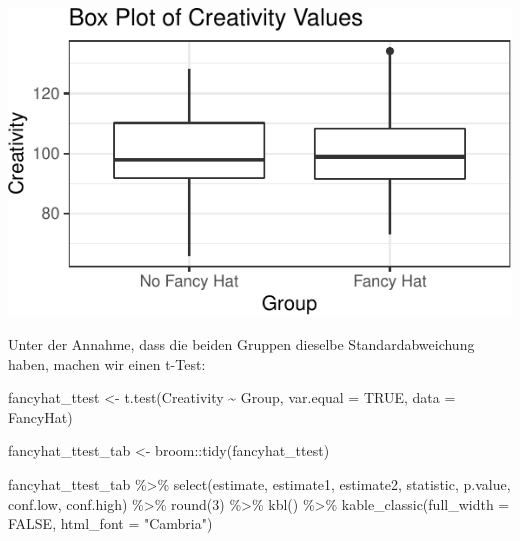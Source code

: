 \documentclass[]{tufte-handout}
\newenvironment{Shaded}{}{}
\newcommand{\AttributeTok}[1]{\textcolor[rgb]{0.49,0.56,0.16}{#1}}
\newcommand{\ConstantTok}[1]{\textcolor[rgb]{0.53,0.00,0.00}{#1}}
\newcommand{\DecValTok}[1]{\textcolor[rgb]{0.25,0.63,0.44}{#1}}
\newcommand{\FunctionTok}[1]{\textcolor[rgb]{0.02,0.16,0.49}{#1}}
\newcommand{\NormalTok}[1]{#1}
\newcommand{\OtherTok}[1]{\textcolor[rgb]{0.00,0.44,0.13}{#1}}
\newcommand{\SpecialCharTok}[1]{\textcolor[rgb]{0.25,0.44,0.63}{#1}}
\newcommand{\StringTok}[1]{\textcolor[rgb]{0.25,0.44,0.63}{#1}}
\begin{document}
\includegraphics{01-intro-bayesian-stats_files/figure-latex/unnamed-chunk-3-1}

Unter der Annahme, dass die beiden Gruppen dieselbe Standardabweichung
haben, machen wir einen t-Test:

\begin{Shaded}
\begin{Highlighting}[]
\NormalTok{fancyhat\_ttest }\OtherTok{\textless{}{-}} \FunctionTok{t.test}\NormalTok{(Creativity }\SpecialCharTok{\textasciitilde{}}\NormalTok{ Group,}
       \AttributeTok{var.equal =} \ConstantTok{TRUE}\NormalTok{,}
       \AttributeTok{data =}\NormalTok{ FancyHat)}
\end{Highlighting}
\end{Shaded}

\begin{Shaded}
\begin{Highlighting}[]
\NormalTok{fancyhat\_ttest\_tab }\OtherTok{\textless{}{-}}\NormalTok{ broom}\SpecialCharTok{::}\FunctionTok{tidy}\NormalTok{(fancyhat\_ttest)}
\end{Highlighting}
\end{Shaded}

\begin{Shaded}
\begin{Highlighting}[]
\NormalTok{fancyhat\_ttest\_tab }\SpecialCharTok{\%\textgreater{}\%}
    \FunctionTok{select}\NormalTok{(estimate, estimate1, estimate2, statistic, p.value, conf.low, conf.high) }\SpecialCharTok{\%\textgreater{}\%}
    \FunctionTok{round}\NormalTok{(}\DecValTok{3}\NormalTok{) }\SpecialCharTok{\%\textgreater{}\%} 
    \FunctionTok{kbl}\NormalTok{() }\SpecialCharTok{\%\textgreater{}\%}
    \FunctionTok{kable\_classic}\NormalTok{(}\AttributeTok{full\_width =} \ConstantTok{FALSE}\NormalTok{, }\AttributeTok{html\_font =} \StringTok{"Cambria"}\NormalTok{)}
\end{Highlighting}
\end{Shaded}
\end{document}
